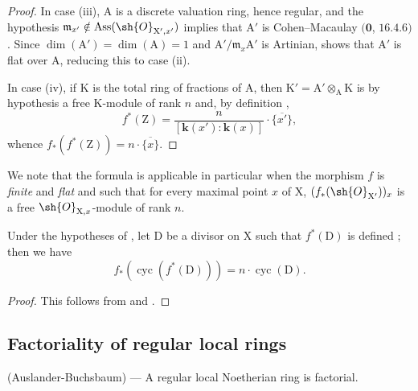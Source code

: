\begin{proof}
In case (iii), $\mathrm{A}$ is a discrete valuation ring, hence regular, and the hypothesis $\mathfrak{m}_{x'}\notin\operatorname{Ass}(\sh{O}_{\mathrm{X}',x'})$ implies that $\mathrm{A}'$ is Cohen--Macaulay $(\mathbf{0}$, $16.4.6)$.  Since $\dim(\mathrm{A}')=\dim(\mathrm{A})=1$ and $\mathrm{A}'/\mathfrak{m}_x\mathrm{A}'$ is Artinian,  shows that $\mathrm{A}'$ is flat over $\mathrm{A}$, reducing this to case (ii).

In case (iv), if $\mathrm{K}$ is the total ring of fractions of $\mathrm{A}$, then $\mathrm{K}'=\mathrm{A}'\otimes_{\mathrm{A}}\mathrm{K}$ is by hypothesis a free $\mathrm{K}$-module of rank $n$ and, by definition ,
\[
  f^*(\mathrm{Z})=\frac{n}{[\boldsymbol{k}(x'):\boldsymbol{k}(x)]}\cdot\overline{\{x'\}},
\]
whence $f_*(f^*(\mathrm{Z}))=n\cdot\overline{\{x\}}$.
\end{proof}

We note that the formula  is applicable in particular when the morphism $f$ is \emph{finite} and \emph{flat} and such that for every maximal point $x$ of $\mathrm{X}$, $(f_*(\sh{O}_{\mathrm{X}'}))_x$ is a free $\sh{O}_{\mathrm{X},x}$-module of rank $n$.

\begin{corollary}[21.10.19]
\label{IV.21.10.19}
Under the hypotheses of , let $\mathrm{D}$ be a divisor on $\mathrm{X}$ such that $f^*(\mathrm{D})$ is defined ; then we have
\[
\label{IV.21.10.19.1}
  f_*(\operatorname{cyc}(f^*(\mathrm{D})))=n\cdot\operatorname{cyc}(\mathrm{D}).
  \tag{21.10.19.1}
\]
\end{corollary}

\begin{proof}
This follows from  and .
\end{proof}
\subsection{Factoriality of regular local rings}
\label{subsection:IV.21.11}
\label{IV.21.11}

\begin{theorem}[21.11.1]
\label{IV.21.11.1}
\textup{(Auslander-Buchsbaum)} ---
A regular local Noetherian ring is factorial.
\end{theorem}

